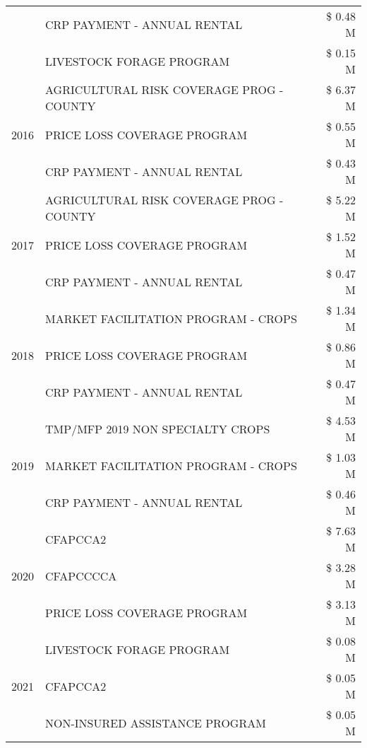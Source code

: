 \begin{tabular}{llr}
 & CRP PAYMENT - ANNUAL RENTAL & \$ 0.48 M \\
 & LIVESTOCK FORAGE PROGRAM & \$ 0.15 M \\
\cline{1-3}
\multirow[t]{3}{*}{2016} & AGRICULTURAL RISK COVERAGE PROG - COUNTY & \$ 6.37 M \\
 & PRICE LOSS COVERAGE PROGRAM & \$ 0.55 M \\
 & CRP PAYMENT - ANNUAL RENTAL & \$ 0.43 M \\
\cline{1-3}
\multirow[t]{3}{*}{2017} & AGRICULTURAL RISK COVERAGE PROG - COUNTY & \$ 5.22 M \\
 & PRICE LOSS COVERAGE PROGRAM & \$ 1.52 M \\
 & CRP PAYMENT - ANNUAL RENTAL & \$ 0.47 M \\
\cline{1-3}
\multirow[t]{3}{*}{2018} & MARKET FACILITATION PROGRAM - CROPS & \$ 1.34 M \\
 & PRICE LOSS COVERAGE PROGRAM & \$ 0.86 M \\
 & CRP PAYMENT - ANNUAL RENTAL & \$ 0.47 M \\
\cline{1-3}
\multirow[t]{3}{*}{2019} & TMP/MFP 2019 NON SPECIALTY CROPS & \$ 4.53 M \\
 & MARKET FACILITATION PROGRAM - CROPS & \$ 1.03 M \\
 & CRP PAYMENT - ANNUAL RENTAL & \$ 0.46 M \\
\cline{1-3}
\multirow[t]{3}{*}{2020} & CFAPCCA2 & \$ 7.63 M \\
 & CFAPCCCCA & \$ 3.28 M \\
 & PRICE LOSS COVERAGE PROGRAM & \$ 3.13 M \\
\cline{1-3}
\multirow[t]{3}{*}{2021} & LIVESTOCK FORAGE PROGRAM & \$ 0.08 M \\
 & CFAPCCA2 & \$ 0.05 M \\
 & NON-INSURED ASSISTANCE PROGRAM & \$ 0.05 M \\
\cline{1-3}
\bottomrule
\end{tabular}
